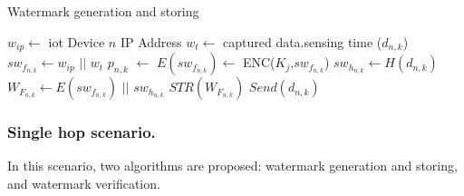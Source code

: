 \documentclass{llncs}
\begin{document}
    \begin{algorithm}[t]
    \caption{Watermark generation and storing}\label{alg1}
    \begin{algorithmic}[1]
    \State $w_{ip} \gets $ \gls*{iot} Device $n$ IP Address
    \State $w_{t} \gets $ captured data.sensing time ($d_{n,k}$)
    \State $sw_{f_{n,k}} \gets w_{ip} $ $||$ $w_{t}$
    \State $p_{n,k}$ $\gets$ $E(sw_{f_{n,k}}) \gets$ ENC($K_j$,$sw_{f_{n,k}}$) 
    \State $sw_{h_{n,k}} \gets H(d_{n,k})$ 
    \State $W_{F_{n,k}} \gets E(sw_{f_{n,k}})$ $ || $ $sw_{h_{n,k}}$
    \State $STR(W_{F_{n,k}})$
    \State $Send(d_{n,k})$
    \EndProcedure
    \end{algorithmic}
    \end{algorithm}
    

    
\subsubsection{Single hop scenario.}
In this scenario, two algorithms are proposed: watermark generation and storing, and watermark verification. 
\end{document}
